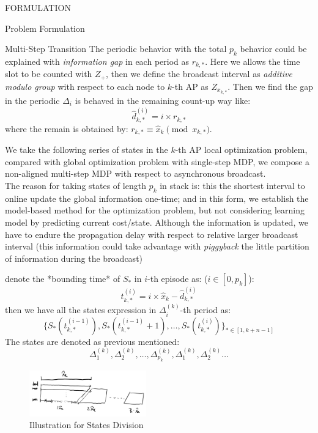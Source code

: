 \documentclass[10pt, conference, letterpaper]{IEEEtran}
\begin{document}
\begin{section}{FORMULATION}
\begin{subsection}{Problem Formulation}
\begin{subsubsection}{Multi-Step Transition}
                The periodic behavior with the total $p_k$ behavior could be explained with \textit{information gap} in each period as $r_{k,*}$. Here we allows the time slot to be counted with $Z_+$, then we define the broadcast interval as \textit{additive modulo group} with respect to each node to $k$-th AP as $Z_{x_{k,*}}$. Then we find the gap in the periodic $\Delta_i$ is behaved in the remaining count-up way like:
                $$
                \hat{d}_{k,*}^{(i)} = i \times r_{k,*}
                $$
                where the remain is obtained by: $r_{k,*} \equiv \hat{x}_k \pmod{x_{k,*}}$.

                We take the following series of states in the $k$-th AP local optimization problem, compared with global optimization problem with single-step MDP, we compose a non-aligned multi-step MDP with respect to asynchronous broadcast.
                \\
                The reason for taking states of length $p_k$ in stack is: this the shortest interval to online update the global information one-time; and in this form, we establish the model-based method for the optimization problem, but not considering learning model by predicting current cost/state. Although the information is updated, we have to endure the propagation delay with respect to relative larger broadcast interval (this information could take advantage with \emph{piggyback} the little partition of information during the broadcast)

                denote the *bounding time* of $S_*$ in $i$-th episode as: ($i \in [0, p_k]$):
                $$
                t^{(i)}_{k,*} = i \times \hat{x}_k - \hat{d}^{(i)}_{k,*}
                $$
                then we have all the states expression in $\Delta^{(k)}_i$-th period as:
                $$
                \{ S_*(t^{(i-1)}_{k,*}), S_*(t^{(i-1)}_{k,*}+1), \dots, S_*(t^{(i)}_{k,*}) \}_{* \in [1,k+n-1]}
                $$
                The states are denoted as previous mentioned:
                $$
                \Delta^{(k)}_{1}, \Delta^{(k)}_{2}, \dots, \Delta^{(k)}_{p_k}, \Delta^{(k)}_{1}, \Delta^{(k)}_{2}\dots
                $$

                \begin{figure}[h]
                    \centering
                    \includegraphics[width=0.45\textwidth]{period-states.png}
                    \caption{Illustration for States Division}
                    \label{fig:division}
                \end{figure}


\end{subsubsection}
\end{subsection}
\end{section}
\end{document}
